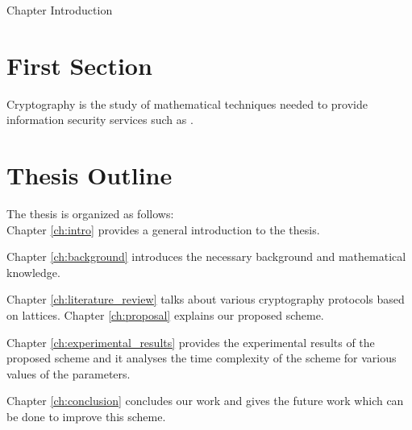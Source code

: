 
Chapter Introduction

\section{First Section}

Cryptography is the study of mathematical techniques needed to provide information security services such as  \cite{menezes1996handbook}. 
\section{Thesis Outline}
The thesis is organized as follows: \\
Chapter \ref{ch:intro} provides a general introduction to the thesis.  \par
Chapter \ref{ch:background} introduces the necessary background and mathematical knowledge. \par
Chapter \ref{ch:literature_review} talks about various cryptography protocols based on lattices.
Chapter \ref{ch:proposal} explains our proposed scheme.\par 
Chapter \ref{ch:experimental_results} provides the experimental results of the proposed scheme and it analyses the time complexity of the scheme for various values of the parameters. \par
Chapter \ref{ch:conclusion} concludes our work and gives the future work which can be done to improve this scheme.